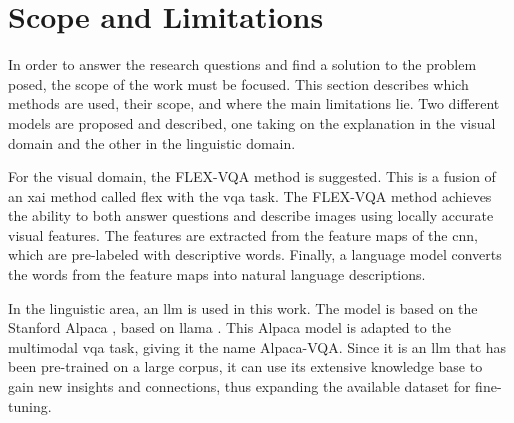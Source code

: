 \label{sec:1_3_scope_and_limitations}

\begin{comment}
Here you can tell the reader about the scope of your thesis, kind of meaning describing what you have done in slighter more detail. The question in section 1.2 might be of the general type, but are you using any specific case studies/application scenarios? Are you limited to a specific type of platform? Have you performed experiments in special environments only, etc.? Describe such information here so that the reader does not expect something going beyond this.
\end{comment}

\section{Scope and Limitations}


    In order to answer the research questions and find a solution to the problem posed, the scope of the work must be focused. This section describes which methods are used, their scope, and where the main limitations lie. Two different models are proposed and described, one taking on the explanation in the visual domain and the other in the linguistic domain.

    For the visual domain, the FLEX-VQA method is suggested. This is a fusion of an \gls{xai} method called \gls{flex} \cite{wickramanayakeFLEXFaithfulLinguistic2019} with the \gls{vqa} task. The FLEX-VQA method achieves the ability to both answer questions and describe images using locally accurate visual features. The features are extracted from the feature maps of the \gls{cnn}, which are pre-labeled with descriptive words. Finally, a language model converts the words from the feature maps into natural language descriptions.

    In the linguistic area, an \gls{llm} is used in this work. The model is based on the Stanford Alpaca \cite{taoriStanfordCRFM, taoriStanfordAlpacaInstructionfollowing2023}, based on \gls{llama} \cite{touvronLLaMAOpenEfficient2023}. This Alpaca model is adapted to the multimodal \gls{vqa} task, giving it the name Alpaca-VQA. Since it is an \gls{llm} that has been pre-trained on a large corpus, it can use its extensive knowledge base to gain new insights and connections, thus expanding the available dataset for fine-tuning. 


